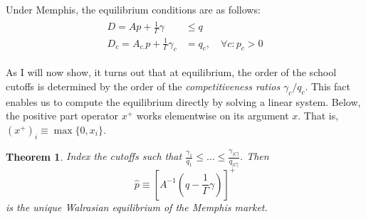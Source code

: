 \documentclass[12pt]{article}
\numberwithin{equation}{subsection}
\newtheorem{theorem}{Theorem}
\theoremstyle{definition}
\begin{document}
Under Memphis, the equilibrium conditions are as follows:
\begin{gather} \label{ssmnleqconds}
\begin{aligned}
D = A p + \frac{1}{\Gamma}\gamma &\leq q \\
D_c = A_{c.} p + \frac{1}{\Gamma} \gamma_c &= q_c, \quad \forall c: p_c > 0
\end{aligned}
\end{gather}

As I will now show, it turns out that at equilibrium, the order of the school cutoffs is determined by the order of the \emph{competitiveness ratios} $\gamma_c / q_c$. This fact enables us to compute the equilibrium directly by solving a linear system. Below, the positive part operator $x^+$ works elementwise on its argument $x$. That is, $(x^+)_i \equiv \max\{0, x_i\}$.

\begin{theorem} \label{cutoffsortationthm}
Index the cutoffs such that $\frac{\gamma_1}{q_1} \leq \dots \leq \frac{\gamma_{|C|}}{q_{|C|}}$. Then %
\[\hat p \equiv \left[A^{-1} (q - \frac{1}{\Gamma} \gamma) \right]^+\]
is the unique Walrasian equilibrium of the Memphis market.
\end{theorem} 
\end{document}
